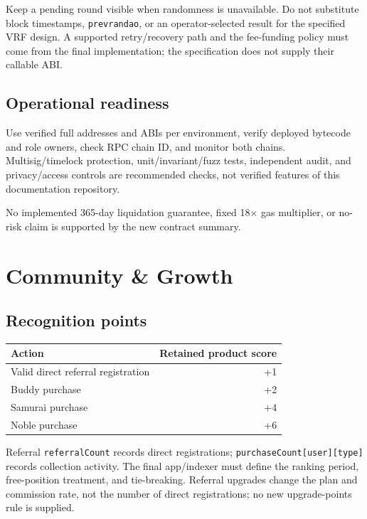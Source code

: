 \documentclass[
  10pt,
  letterpaper,
]{article}
\begin{document}
Keep a pending round visible when randomness is unavailable. Do not
substitute block timestamps, \texttt{prevrandao}, or an
operator-selected result for the specified VRF design. A supported
retry/recovery path and the fee-funding policy must come from the final
implementation; the specification does not supply their callable ABI.

\subsection{Operational readiness}\label{operational-readiness}

Use verified full addresses and ABIs per environment, verify deployed
bytecode and role owners, check RPC chain ID, and monitor both chains.
Multisig/timelock protection, unit/invariant/fuzz tests, independent
audit, and privacy/access controls are recommended checks, not verified
features of this documentation repository.

No implemented 365-day liquidation guarantee, fixed 18× gas multiplier,
or no-risk claim is supported by the new contract summary.

\section{Community \& Growth}\label{community-growth}

\subsection{Recognition points}\label{recognition-points}

\begin{longtable}[]{@{}lr@{}}
\toprule\noalign{}
Action & Retained product score \\
\midrule\noalign{}
\endhead
\bottomrule\noalign{}
\endlastfoot
Valid direct referral registration & +1 \\
Buddy purchase & +2 \\
Samurai purchase & +4 \\
Noble purchase & +6 \\
\end{longtable}

Referral \texttt{referralCount} records direct registrations;
\texttt{purchaseCount{[}user{]}{[}type{]}} records collection activity.
The final app/indexer must define the ranking period, free-position
treatment, and tie-breaking. Referral upgrades change the plan and
commission rate, not the number of direct registrations; no new
upgrade-points rule is supplied.
\end{document}
